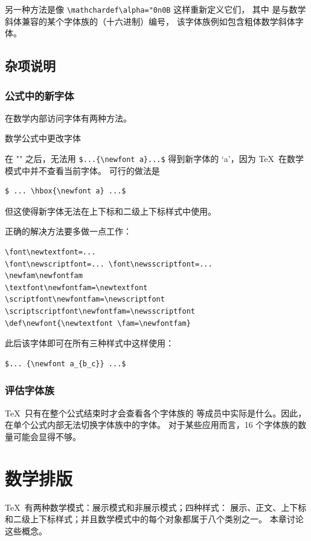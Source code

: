 \documentclass[a4paper]{rapport3}
\def\howto#1\par{}
\begin{document}
另一种方法是像 \verb.\mathchardef\alpha="0n0B. 这样重新定义它们，
其中  是与数学斜体兼容的某个字体族的（十六进制）编号，
该字体族例如包含粗体数学斜体字体。


\section{杂项说明}

\subsection{公式中的新字体}

在数学内部访问字体有两种方法。
\howto 在数学公式中更改字体\par
\mdqon
在 "" 之后，无法用 \verb-$...{\newfont a}...$-
\mdqoff
得到新字体的 `a'，因为 \TeX\ 在数学模式中并不查看当前字体。
可行的做法是
\begin{verbatim}
$ ... \hbox{\newfont a} ...$
\end{verbatim}
但这使得新字体无法在上下标和二级上下标样式中使用。

正确的解决方法要多做一点工作：
\begin{verbatim}
\font\newtextfont=... 
\font\newscriptfont=... \font\newsscriptfont=...
\newfam\newfontfam
\textfont\newfontfam=\newtextfont
\scriptfont\newfontfam=\newscriptfont
\scriptscriptfont\newfontfam=\newsscriptfont
\def\newfont{\newtextfont \fam=\newfontfam}
\end{verbatim}
此后该字体即可在所有三种样式中这样使用：
\begin{verbatim}
$... {\newfont a_{b_c}} ...$
\end{verbatim}

\subsection{评估字体族}

\TeX\ 只有在整个公式结束时才会查看各个字体族的 
等成员中实际是什么。因此，在单个公式内部无法切换字体族中的字体。
对于某些应用而言，16 个字体族的数量可能会显得不够。


\endofchapter
\chapter{数学排版}\label{math}

\TeX\ 有两种数学模式：展示模式和非展示模式；四种样式：
\altt
展示、正文、上下标和二级上下标样式；并且数学模式中的每个对象都属于八个类别之一。
本章讨论这些概念。
\end{document}
